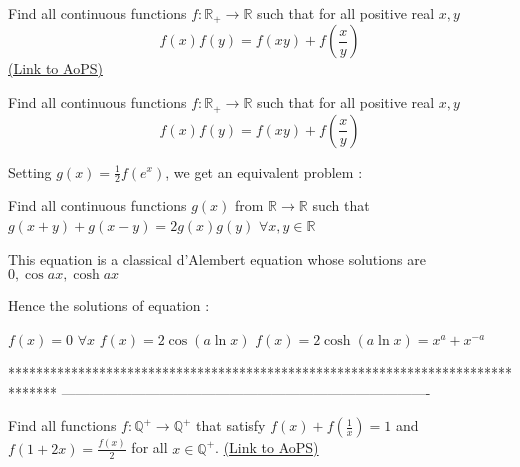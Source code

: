 \begin{problem}
	Find all continuous functions $f:\mathbb R_+\to\mathbb R$ such that for all positive real $x,y$
\[f(x)f(y)=f(xy)+f\left (\frac x y\right )\]
	\flushright \href{https://artofproblemsolving.com/community/c6h536676}{(Link to AoPS)}
\end{problem}



\begin{solution}
	\begin{tcolorbox}Find all continuous functions $f:\mathbb R_+\to\mathbb R$ such that for all positive real $x,y$
\[f(x)f(y)=f(xy)+f\left (\frac x y\right )\]\end{tcolorbox}
Setting $g(x)=\frac 12f(e^x)$, we get an equivalent problem :

Find all continuous functions $g(x)$ from $\mathbb R\to\mathbb R$ such that $g(x+y)+g(x-y)=2g(x)g(y)$ $\forall x,y\in\mathbb R$

This equation is a classical d'Alembert equation whose solutions are $0,\cos ax, \cosh ax$

Hence the solutions of equation :

$f(x)=0$ $\forall x$
$f(x)=2\cos(a\ln x)$
$f(x)=2\cosh(a\ln x)=x^a+x^{-a}$
\end{solution}
*******************************************************************************
-------------------------------------------------------------------------------

\begin{problem}
	Find all functions $ f: \mathbb{Q}^+\rightarrow\mathbb{Q}^+ $ that satisfy
$ f(x)+f(\frac{1}{x})=1 $ and $ f(1+2x)=\frac{f(x)}{2} $ for all $ x\in\mathbb{Q}^+ $.
	\flushright \href{https://artofproblemsolving.com/community/c6h536877}{(Link to AoPS)}
\end{problem}



